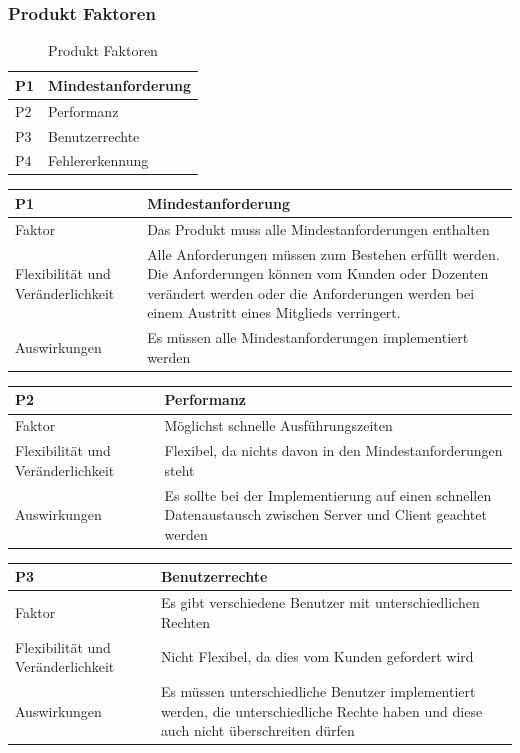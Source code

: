 \documentclass[fontsize=12pt,paper=a4,twoside]{scrartcl}
\begin{document}
\subsubsection{Produkt Faktoren}
\label{sec:produktfaktoren}

\begin{table}[H]
\centering
\caption{Produkt Faktoren}
\begin{tabular}{|l|l|} \hline
P1 & Mindestanforderung \\ \hline
P2 &  Performanz\\ \hline
P3 &  Benutzerrechte \\ \hline
P4 &  Fehlererkennung \\ \hline
\end{tabular}
\end{table}

\begin{table}[H]
\begin{tabular}{|p{3cm}|p{12cm}|}\hline
P1 & Mindestanforderung \\ \hline
Faktor & Das Produkt muss alle Mindestanforderungen enthalten\\ \hline
Flexibilität und Veränderlichkeit & Alle Anforderungen müssen zum Bestehen erfüllt werden. Die Anforderungen können vom Kunden oder Dozenten verändert werden oder die Anforderungen werden bei einem Austritt eines Mitglieds verringert.\\ \hline
Auswirkungen & Es müssen alle Mindestanforderungen implementiert werden \\ \hline
\end{tabular}
\end{table}


\begin{table}[H]
\begin{tabular}{|p{3cm}|p{12cm}|}\hline
P2 &  Performanz\\ \hline
Faktor & Möglichst schnelle Ausführungszeiten\\ \hline
Flexibilität und Veränderlichkeit & Flexibel, da nichts davon in den Mindestanforderungen steht\\ \hline
Auswirkungen & Es sollte bei der Implementierung auf einen schnellen Datenaustausch zwischen Server und Client geachtet werden \\ \hline
\end{tabular}
\end{table}

\begin{table}[H]
\begin{tabular}{|p{3cm}|p{12cm}|}\hline
P3 &  Benutzerrechte \\ \hline
Faktor & Es gibt verschiedene Benutzer mit unterschiedlichen Rechten\\ \hline
Flexibilität und Veränderlichkeit & Nicht Flexibel, da dies vom Kunden gefordert wird\\ \hline
Auswirkungen & Es müssen unterschiedliche Benutzer implementiert werden, die unterschiedliche Rechte haben und diese auch nicht überschreiten dürfen \\ \hline
\end{tabular}
\end{table}
\end{document}
